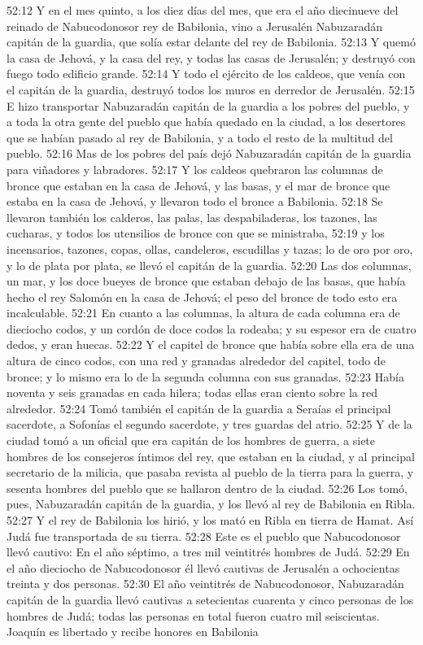 52:12 Y en el mes quinto, a los diez días del mes, que era el año diecinueve del reinado de Nabucodonosor rey de Babilonia, vino a Jerusalén Nabuzaradán capitán de la guardia, que solía estar delante del rey de Babilonia. 
52:13 Y quemó la casa de Jehová, y la casa del rey, y todas las casas de Jerusalén; y destruyó con fuego todo edificio grande. 
52:14 Y todo el ejército de los caldeos, que venía con el capitán de la guardia, destruyó todos los muros en derredor de Jerusalén. 
52:15 E hizo transportar Nabuzaradán capitán de la guardia a los pobres del pueblo, y a toda la otra gente del pueblo que había quedado en la ciudad, a los desertores que se habían pasado al rey de Babilonia, y a todo el resto de la multitud del pueblo. 
52:16 Mas de los pobres del país dejó Nabuzaradán capitán de la guardia para viñadores y labradores. 
52:17 Y los caldeos quebraron las columnas de bronce que estaban en la casa de Jehová, y las basas, y el mar de bronce que estaba en la casa de Jehová, y llevaron todo el bronce a Babilonia. 
52:18 Se llevaron también los calderos, las palas, las despabiladeras, los tazones, las cucharas, y todos los utensilios de bronce con que se ministraba, 
52:19 y los incensarios, tazones, copas, ollas, candeleros, escudillas y tazas; lo de oro por oro, y lo de plata por plata, se llevó el capitán de la guardia. 
52:20 Las dos columnas, un mar, y los doce bueyes de bronce que estaban debajo de las basas, que había hecho el rey Salomón en la casa de Jehová; el peso del bronce de todo esto era incalculable. 
52:21 En cuanto a las columnas, la altura de cada columna era de dieciocho codos, y un cordón de doce codos la rodeaba; y su espesor era de cuatro dedos, y eran huecas. 
52:22 Y el capitel de bronce que había sobre ella era de una altura de cinco codos, con una red y granadas alrededor del capitel, todo de bronce; y lo mismo era lo de la segunda columna con sus granadas. 
52:23 Había noventa y seis granadas en cada hilera; todas ellas eran ciento sobre la red alrededor.  
52:24 Tomó también el capitán de la guardia a Seraías el principal sacerdote, a Sofonías el segundo sacerdote, y tres guardas del atrio. 
52:25 Y de la ciudad tomó a un oficial que era capitán de los hombres de guerra, a siete hombres de los consejeros íntimos del rey, que estaban en la ciudad, y al principal secretario de la milicia, que pasaba revista al pueblo de la tierra para la guerra, y sesenta hombres del pueblo que se hallaron dentro de la ciudad. 
52:26 Los tomó, pues, Nabuzaradán capitán de la guardia, y los llevó al rey de Babilonia en Ribla. 
52:27 Y el rey de Babilonia los hirió, y los mató en Ribla en tierra de Hamat. Así Judá fue transportada de su tierra. 
52:28 Este es el pueblo que Nabucodonosor llevó cautivo: En el año séptimo, a tres mil veintitrés hombres de Judá. 
52:29 En el año dieciocho de Nabucodonosor él llevó cautivas de Jerusalén a ochocientas treinta y dos personas. 
52:30 El año veintitrés de Nabucodonosor, Nabuzaradán capitán de la guardia llevó cautivas a setecientas cuarenta y cinco personas de los hombres de Judá; todas las personas en total fueron cuatro mil seiscientas. 
Joaquín es libertado y recibe honores en Babilonia 


